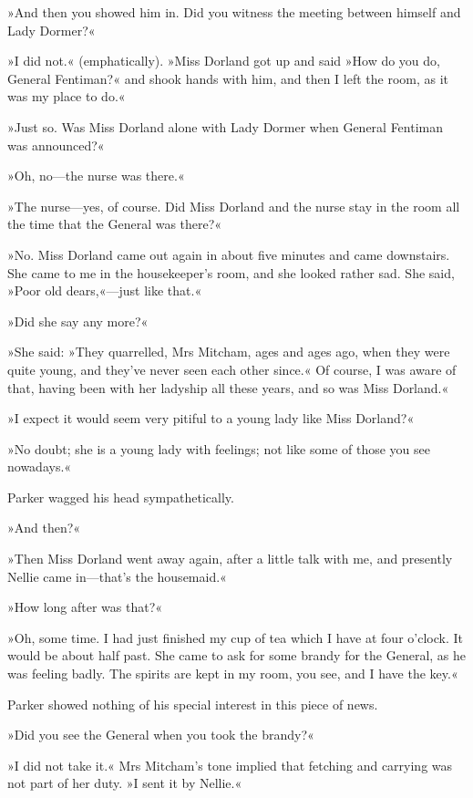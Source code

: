 »And then you showed him in. Did you witness the meeting between himself and Lady Dormer?«

»I did not.« (emphatically). »Miss Dorland got up and said »How do you do, General Fentiman?« and shook hands with him, and then I left the room, as it was my place to do.«

»Just so. Was Miss Dorland alone with Lady Dormer when General Fentiman was announced?«

»Oh, no\allowbreak---\allowbreak the nurse was there.«

»The nurse\allowbreak---\allowbreak yes, of course. Did Miss Dorland and the nurse stay in the room all the time that the General was there?«

»No. Miss Dorland came out again in about five minutes and came downstairs. She came to me in the housekeeper's room, and she looked rather sad. She said, »Poor old dears,«---just like that.«

»Did she say any more?«

»She said: »They quarrelled, Mrs Mitcham, ages and ages ago, when they were quite young, and they've never seen each other since.« Of course, I was aware of that, having been with her ladyship all these years, and so was Miss Dorland.«

»I expect it would seem very pitiful to a young lady like Miss Dorland?«

»No doubt; she is a young lady with feelings; not like some of those you see nowadays.«

Parker wagged his head sympathetically.

»And then?«

»Then Miss Dorland went away again, after a little talk with me, and presently Nellie came in\allowbreak---\allowbreak that's the housemaid.«

»How long after was that?«

»Oh, some time. I had just finished my cup of tea which I have at four o'clock. It would be about half past. She came to ask for some brandy for the General, as he was feeling badly. The spirits are kept in my room, you see, and I have the key.«

Parker showed nothing of his special interest in this piece of news.

»Did you see the General when you took the brandy?«

»I did not take it.« Mrs Mitcham's tone implied that fetching and carrying was not part of her duty. »I sent it by Nellie.«

